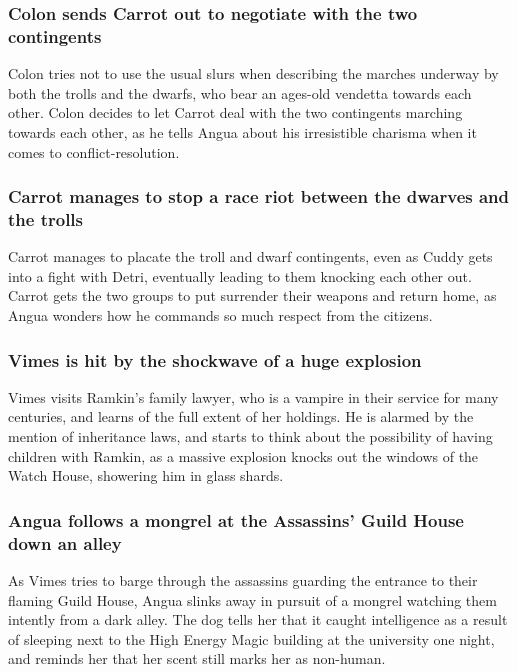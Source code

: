 \subsubsection{\Gls{Colon} sends \Gls{Carrot} out to negotiate with the two contingents}
\Gls{Colon} tries not to use the usual slurs when describing the marches underway by both the
trolls and the dwarfs, who bear an ages-old vendetta towards each other. \Gls{Colon} decides to let
\Gls{Carrot} deal with the two contingents marching towards each other, as he tells \Gls{Angua}
about his irresistible charisma when it comes to conflict-resolution.

\subsubsection{\Gls{Carrot} manages to stop a race riot between the dwarves and the trolls}
\Gls{Carrot} manages to placate the troll and dwarf contingents, even as \Gls{Cuddy} gets into a
fight with \Gls{Detri}, eventually leading to them knocking each other out. \Gls{Carrot} gets the
two groups to put surrender their weapons and return home, as \Gls{Angua} wonders how he commands so
much respect from the citizens.

\subsubsection{\Gls{Vimes} is hit by the shockwave of a huge explosion}
\Gls{Vimes} visits \Gls{Ramkin}'s family lawyer, who is a vampire in their service for many
centuries, and learns of the full extent of her holdings. He is alarmed by the mention of
inheritance laws, and starts to think about the possibility of having children with \Gls{Ramkin},
as a massive explosion knocks out the windows of the Watch House, showering him in glass shards.

\subsubsection{\Gls{Angua} follows a mongrel at the Assassins' Guild House down an alley}
As \Gls{Vimes} tries to barge through the assassins guarding the entrance to their flaming Guild
House, \Gls{Angua} slinks away in pursuit of a mongrel watching them intently from a dark alley. The
dog tells her that it caught intelligence as a result of sleeping next to the High Energy Magic
building at the university one night, and reminds her that her scent still marks her as non-human.

